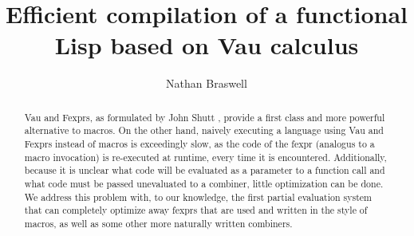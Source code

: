 \documentclass[acmsmall]{acmart}
\begin{document}
\title{Efficient compilation of a functional Lisp based on Vau calculus}

\author{Nathan Braswell}


\begin{abstract}
  Vau and Fexprs, as formulated by John Shutt \cite{shutt2010fexprs}, provide a first class and more powerful alternative to
  macros. On the other hand, naively executing a language using Vau and Fexprs instead of macros is exceedingly slow,
  as the code of the fexpr (analogus to a macro invocation) is re-executed at runtime, every time it is encountered.
  Additionally, because it is unclear what code will be evaluated as a parameter to a function call and what code
  must be passed unevaluated to a combiner, little optimization can be done. We address this problem with, to our knowledge,
  the first partial evaluation system that can completely optimize away fexprs that are used and written in the style of macros,
  as well as some other more naturally written combiners.
\end{abstract}
\end{document}
